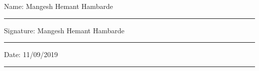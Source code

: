 \documentclass[12pt,oneside]{book}
\begin{document}
\noindent Name: Mangesh Hemant Hambarde\\[1mm]
\rule[1em]{25em}{0.5pt}

\noindent Signature: Mangesh Hemant Hambarde\\[1mm]
\rule[1em]{25em}{0.5pt}

\noindent Date: 11/09/2019\\[1mm]
\rule[1em]{25em}{0.5pt}





\tableofcontents
\listoffigures
\listoftables


\mainmatter












\end{document}

